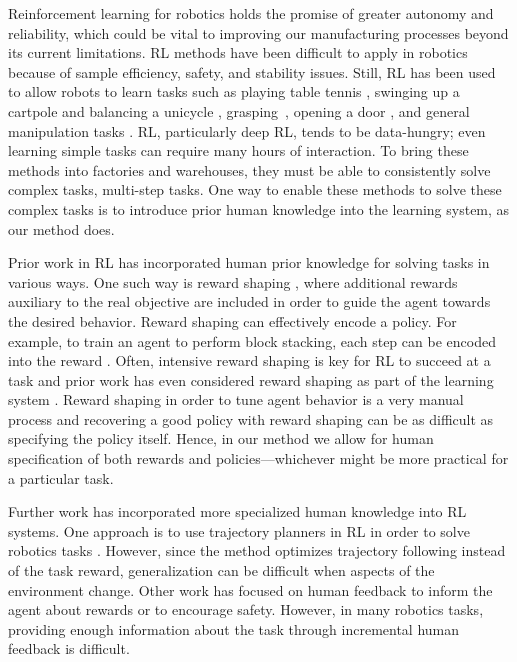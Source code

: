 Reinforcement learning for robotics holds the promise of greater autonomy and reliability, which could be vital to improving our manufacturing processes beyond its current limitations.
RL methods have been difficult to apply in robotics because of sample efficiency, safety, and stability issues. Still, RL has been used to allow robots to learn tasks such as playing table tennis \cite{peters2010reps}, swinging up a cartpole and balancing a unicycle \cite{deisenroth2011pilco}, grasping~\cite{pinto2017robust, levine2017grasping}, opening a door \cite{Gu2016b}, and general manipulation tasks \cite{levine2016gps, haarnoja2018sac}. RL, particularly deep RL, tends to be data-hungry; even learning simple tasks can require many hours of interaction. To bring these methods into factories and warehouses, they must be able to consistently solve complex tasks, multi-step tasks. One way to enable these methods to solve these complex tasks is to introduce prior human knowledge into the learning system, as our method does.

Prior work in RL has incorporated human prior knowledge for solving tasks in various ways. One such way is reward shaping \cite{ng1999rewardshaping}, where additional rewards auxiliary to the real objective are included in order to guide the agent towards the desired behavior. Reward shaping can effectively encode a policy. For example, to train an agent to perform block stacking, each step can be encoded into the reward \cite{popov17stacking}. Often, intensive reward shaping is key for RL to succeed at a task and prior work has even considered reward shaping as part of the learning system \cite{daniel2014activereward}. Reward shaping in order to tune agent behavior is a very manual process and recovering a good policy with reward shaping can be as difficult as specifying the policy itself. Hence, in our method we allow for human specification of both rewards and policies---whichever might be more practical for a particular task.

Further work has incorporated more specialized human knowledge into RL systems. One approach is to use trajectory planners in RL in order to solve robotics tasks \cite{thomas2018cad}. However, since the method optimizes trajectory following instead of the task reward, generalization can be difficult when aspects of the environment change. Other work has focused on human feedback \cite{loftin2014discretehumanfeedback, saunders2018trialwithouterror, torrey2013teachingbudget, frank2008rareevents, christiano2017humanpreferences} to inform the agent about rewards or to encourage safety. However, in many robotics tasks, providing enough information about the task through incremental human feedback is difficult.

